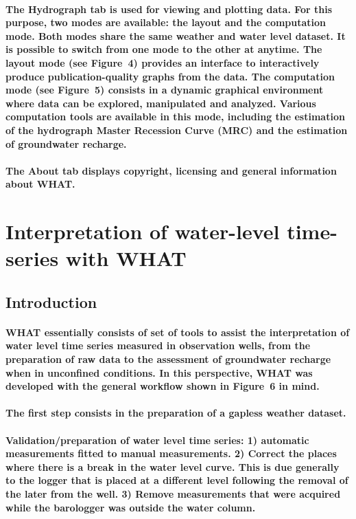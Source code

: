 \documentclass[10pt, letterpaper, fleqn]{report}
\begin{document}
\paragraph{The Hydrograph tab is used for viewing and plotting data. For this purpose, two modes are available: the layout and the computation mode. Both modes share the same weather and water level dataset. It is possible to switch from one mode to the other at anytime. The layout mode (see Figure 4) provides an interface to interactively produce publication-quality graphs from the data. The computation mode (see Figure 5) consists in a dynamic graphical environment where data can be explored, manipulated and analyzed. Various computation tools are available in this mode, including the estimation of the hydrograph Master Recession Curve (MRC) and the estimation of groundwater recharge.}

\paragraph{The About tab displays copyright, licensing and general information about WHAT.}

\section{Interpretation of water-level time-series with WHAT}

\subsection{Introduction}

\paragraph{WHAT essentially consists of set of tools to assist the interpretation of water level time series measured in observation wells, from the preparation of raw data to the assessment of groundwater recharge when in unconfined conditions. In this perspective, WHAT was developed with the general workflow shown in Figure 6  in mind.}

\paragraph{The first step consists in the preparation of a gapless weather dataset.}

\paragraph{Validation/preparation of water level time series: 1) automatic measurements fitted to manual measurements. 2) Correct the places where there is a break in the water level curve. This is due generally to the logger that is placed at a different level following the removal of the later from the well. 3) Remove measurements that were acquired while the barologger was outside the water column.}
\end{document}
